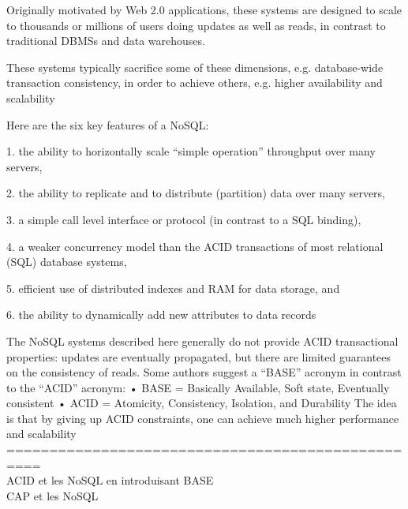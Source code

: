 Originally motivated by Web 2.0 applications, these
systems are designed to scale to thousands or millions
of users doing updates as well as reads, in contrast to
traditional DBMSs and data warehouses.

These systems typically sacrifice some of
these dimensions, e.g. database-wide transaction
consistency, in order to achieve others, e.g. higher
availability and scalability

Here are the six key features of a \textsf{NoSQL}:

1. the ability to horizontally scale “simple
operation” throughput over many servers,

2. the ability to replicate and to distribute (partition)
data over many servers,

3. a simple call level interface or protocol (in
contrast to a SQL binding),

4. a weaker concurrency model than the ACID
transactions of most relational (SQL) database
systems,

5. efficient use of distributed indexes and RAM for
data storage, and

6. the ability to dynamically add new attributes to
data records

The NoSQL systems described here generally do not
provide ACID transactional properties: updates are
eventually propagated, but there are limited guarantees
on the consistency of reads. Some authors suggest a
“BASE” acronym in contrast to the “ACID” acronym:
• BASE = Basically Available, Soft state,
Eventually consistent
• ACID = Atomicity, Consistency, Isolation, and
Durability
The idea is that by giving up ACID constraints, one
can achieve much higher performance and scalability\\
==================================================\\
ACID et les NoSQL en introduisant BASE\\
CAP et les NoSQL\\
